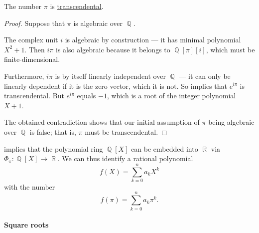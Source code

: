 \begin{corollary}\label{thm:pi_is_transcendental}
  The number \hyperref[def:pi]{\( \pi \)} is \hyperref[def:transcendental_number]{transcendental}.
\end{corollary}
\begin{proof}
  Suppose that \( \pi \) is algebraic over \( \BbbQ \).

  The complex unit \( i \) is algebraic by construction --- it has minimal polynomial \( X^2 + 1 \). Then \( i\pi \) is also algebraic because it belongs to \( \BbbQ[\pi][i] \), which must be finite-dimensional.

  Furthermore, \( i\pi \) is by itself linearly independent over \( \BbbQ \) --- it can only be linearly dependent if it is the zero vector, which it is not. So  implies that \( e^{i\pi} \) is transcendental. But \( e^{i\pi} \) equals \( -1 \), which is a root of the integer polynomial \( X + 1 \).

  The obtained contradiction shows that our initial assumption of \( \pi \) being algebraic over \( \BbbQ \) is false; that is, \( \pi \) must be transcendental.
\end{proof}

\begin{example}\label{ex:polynomials_over_pi}
   implies that the polynomial ring \( \BbbQ[X] \) can be embedded into \( \BbbR \) via \( \Phi_\pi: \BbbQ[X] \to \BbbR \). We can thus identify a rational polynomial
  \begin{equation*}
    f(X) = \sum_{k=0}^n a_k X^k
  \end{equation*}
  with the number
  \begin{equation*}
    f(\pi) = \sum_{k=0}^n a_k \pi^k.
  \end{equation*}
\end{example}

\paragraph{Square roots}

